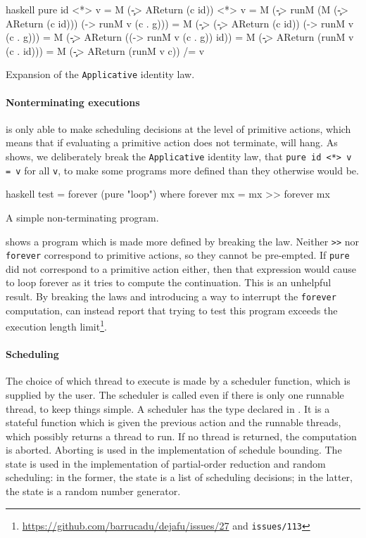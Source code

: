 \begin{listing}
\centering
\begin{cminted}{haskell}
pure id <*> v
  = M (\c -> AReturn (c id)) <*> v
  = M (\c -> runM (M (\c -> AReturn (c id))) (\g -> runM v (c . g)))
  = M (\c -> (\c -> AReturn (c id)) (\g -> runM v (c . g)))
  = M (\c -> AReturn ((\g -> runM v (c . g)) id))
  = M (\c -> AReturn (runM v (c . id)))
  = M (\c -> AReturn (runM v c))
 /= v
\end{cminted}
\caption{Expansion of the \texttt{Applicative} identity law.}\label{lst:areturn}
\end{listing}

\paragraph{Nonterminating executions}
\dejafu{} is only able to make scheduling decisions at the level of
primitive actions, which means that if evaluating a primitive action
does not terminate, \dejafu{} will hang.  As  shows,
we deliberately break the \verb|Applicative| identity law, that
\verb|pure id <*> v = v| for all \verb|v|, to make some programs more
defined than they otherwise would be.

\begin{listing}
\centering
\begin{cminted}{haskell}
test = forever (pure "loop") where
  forever mx = mx >> forever mx
\end{cminted}
\caption{A simple non-terminating program.}\label{lst:forever}
\end{listing}

 shows a program which is made more defined by
breaking the law.  Neither \verb|>>| nor \verb|forever| correspond to
primitive actions, so they cannot be pre-empted.  If \verb|pure| did
not correspond to a primitive action either, then that expression
would cause \dejafu{} to loop forever as it tries to compute the
continuation.  This is an unhelpful result.  By breaking the laws and
introducing a way to interrupt the \verb|forever| computation,
\dejafu{} can instead report that trying to test this program exceeds
the execution length
limit\footnote{\url{https://github.com/barrucadu/dejafu/issues/27} and
  \texttt{issues/113}}.

\paragraph{Scheduling}
The choice of which thread to execute is made by a scheduler function,
which is supplied by the user.  The scheduler is called even if there
is only one runnable thread, to keep things simple.  A scheduler has
the type declared in .  It is a stateful function
which is given the previous action and the runnable threads, which
possibly returns a thread to run.  If no thread is returned, the
computation is aborted.  Aborting is used in the implementation of
schedule bounding.  The state is used in the implementation of
partial-order reduction and random scheduling: in the former, the
state is a list of scheduling decisions; in the latter, the state is a
random number generator.


